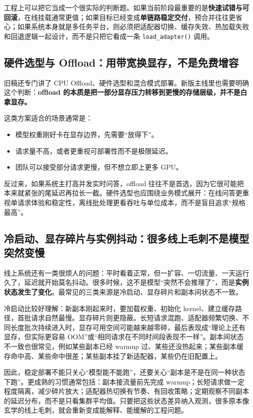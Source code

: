 工程上可以把它当成一个很实际的判断题。如果当前阶段最重要的是\textbf{快速试错与可回滚}，在线挂载通常更值；如果目标已经变成\textbf{单链路稳定交付}，预合并往往更省心；如果系统本身就是多任务平台，则必须把适配器切换、缓存失效、热加载失败和回退逻辑一起设计，而不是只把它看成一条 \texttt{load\_adapter()} 调用。

\subsection{硬件选型与 Offload：用带宽换显存，不是免费增容}
旧稿还专门讲了 CPU Offload、硬件选型和混合模式部署。新版主线里也需要明确这个判断：\textbf{offload 的本质是把一部分显存压力转移到更慢的存储层级，并不是白拿显存。}

这类方案适合的场景通常是：
\begin{itemize}
  \item 模型权重刚好卡在显存边界，先需要“放得下”。
  \item 请求量不高，或者更重视可部署性而不是极限延迟。
  \item 团队可以接受部分请求更慢，但不想立即上更多 GPU。
\end{itemize}

反过来，如果系统主打高并发实时问答，offload 往往不是首选，因为它很可能把本来就紧张的尾延迟再拉长一截。硬件选型也应围绕业务模式展开：在线问答更重视单请求体验和稳定性，离线批处理更看吞吐与单位成本，而不是盲目追求“规格最高”。

\subsection{冷启动、显存碎片与实例抖动：很多线上毛刺不是模型突然变慢}
线上系统还有一类很烦人的问题：平时看着正常，但一扩容、一切流量、一天运行久了，延迟就开始莫名抖动。很多时候，这不是模型“突然不会推理了”，而是\textbf{实例状态发生了变化}。最常见的三类来源是冷启动、显存碎片和副本间状态不一致。

冷启动比较好理解：新副本刚起来时，要加载权重、初始化 kernel、建立缓存路径，首批请求自然最慢。显存碎片则更隐蔽。长短请求混跑、适配器频繁切换、不同长度批次持续进入时，显存可用空间可能越来越零碎，最后表现成“理论上还有显存，但实际更容易 OOM”或“相同请求在不同时间段表现不一样”。副本间状态不一致也很常见，例如某些副本已经 warmup 过、某些还没热起来；某些副本缓存命中高、某些命中很差；某些副本挂了新适配器，某些仍在旧配置上。

因此，稳定部署不能只关心“模型能不能跑”，还要关心“副本是不是在同一种状态下跑”。更成熟的习惯通常包括：副本接流量前先完成 warmup；长短请求做一定程度隔离，减少碎片放大；适配器热切换有节奏、有回收策略；定期观察不同副本的延迟分布，而不是只看集群平均值。只要把这些状态差异纳入观测，很多原本像玄学的线上毛刺，就会重新变成能解释、能缓解的工程问题。

